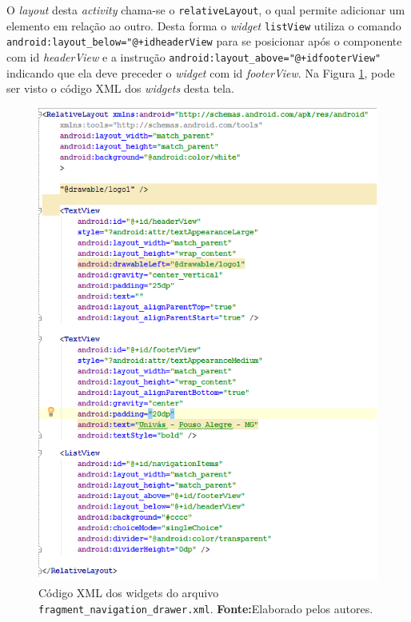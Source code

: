 	\par O \textit{layout} desta \textit{activity} chama-se o
\texttt{relativeLayout}, o qual permite adicionar um elemento em relação ao
outro. Desta forma o \textit{widget} \texttt{listView} utiliza o comando
\texttt{android:layout\_below="@+id\/headerView} para se posicionar após o
componente com id \textit{headerView} e a instrução
\texttt{android:layout\_above="@+id\/footerView"} indicando que ela deve
preceder o \textit{widget} com id \textit{footerView}. Na Figura \ref{fig:app},
pode ser visto o código XML dos \textit{widgets} desta tela.

	\begin{figure}[h!] 
		\centerline{\includegraphics[scale=0.8]{./imagens/2_q_metodologico/4_procedimentos_resultados/42_aplicativo/app.png}}
		\caption[Código XML dos widgets do arquivo
		fragment\_navigation\_drawer.xml]{Código XML dos widgets do arquivo
		\texttt{fragment\_navigation\_drawer.xml}.
		\textbf{Fonte:}Elaborado pelos autores.}
		\label{fig:app}
	\end{figure}
	
